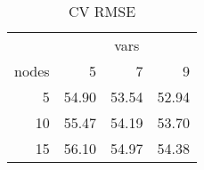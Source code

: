 \begin{table}

\caption{\label{tab:}CV RMSE}
\centering
\begin{tabular}[t]{r|r|r|r}
\hline
\multicolumn{1}{c|}{ } & \multicolumn{3}{c}{vars} \\
\cline{2-4}
nodes & 5 & 7 & 9\\
\hline
5 & 54.90 & 53.54 & 52.94\\
\hline
10 & 55.47 & 54.19 & 53.70\\
\hline
15 & 56.10 & 54.97 & 54.38\\
\hline
\end{tabular}
\end{table}